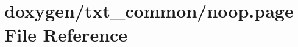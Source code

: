 \hypertarget{noop_8page}{\section{doxygen/txt\-\_\-common/noop.page File Reference}
\label{noop_8page}
}
